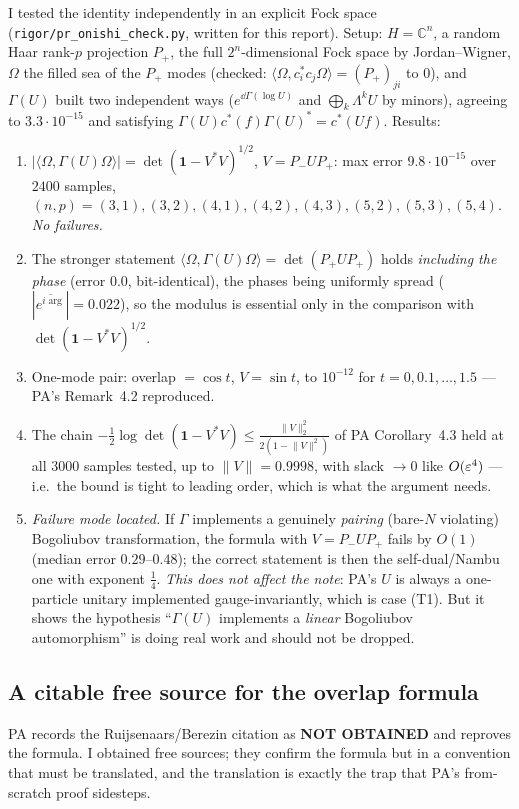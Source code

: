 \documentclass[11pt]{article}
\newcommand{\Pp}{P_+}\newcommand{\Pm}{P_-}
\providecommand{\Om}{\Omega}\providecommand{\Gm}{\Gamma}\providecommand{\Qt}{\widetilde Q}
\providecommand{\norm}[1]{\lVert #1\rVert}\providecommand{\abs}[1]{\lvert #1\rvert}
\providecommand{\ip}[2]{\langle #1,#2\rangle}\providecommand{\one}{\mathbf 1}
\begin{document}
I tested the identity independently in an explicit Fock space
(\texttt{rigor/pr\_onishi\_check.py}, written for this report).  Setup: $H=\mathbb C^n$, a random
Haar rank-$p$ projection $\Pp$, the full $2^n$-dimensional Fock space by Jordan--Wigner, $\Om$ the
filled sea of the $\Pp$ modes (checked: $\ip\Om{c_i^*c_j\Om}=(\Pp)_{ji}$ to $0$), and $\Gm(U)$ built
two independent ways ($e^{\dd\Gm(\log U)}$ and $\bigoplus_k\Lambda^kU$ by minors), agreeing to
$3.3\cdot10^{-15}$ and satisfying $\Gm(U)c^*(f)\Gm(U)^*=c^*(Uf)$.  Results:
\begin{enumerate}[label=(T\arabic*),leftmargin=3em]
\item $|\ip\Om{\Gm(U)\Om}|=\det(\one-V^*V)^{1/2}$, $V=\Pm U\Pp$: max error $9.8\cdot10^{-15}$ over
 $2400$ samples, $(n,p)=(3,1),(3,2),(4,1),(4,2),(4,3),(5,2),(5,3),(5,4)$.  \emph{No failures.}
\item The stronger statement $\ip\Om{\Gm(U)\Om}=\det(\Pp U\Pp)$ holds \emph{including the phase}
 (error $0.0$, bit-identical), the phases being uniformly spread ($|\overline{e^{i\arg}}|=0.022$),
 so the modulus is essential only in the comparison with $\det(\one-V^*V)^{1/2}$.
\item One-mode pair: overlap $=\cos t$, $V=\sin t$, to $10^{-12}$ for $t=0,0.1,\dots,1.5$
 --- PA's Remark~4.2 reproduced.
\item The chain $-\tfrac12\log\det(\one-V^*V)\le\frac{\norm V_2^2}{2(1-\norm V^2)}$ of PA
 Corollary~4.3 held at all $3000$ samples tested, up to $\norm V=0.9998$, with slack $\to0$ like
 $O(\varepsilon^4)$ --- i.e.\ the bound is tight to leading order, which is what the argument needs.
\item \emph{Failure mode located.}  If $\Gm$ implements a genuinely \emph{pairing} (bare-$N$
 violating) Bogoliubov transformation, the formula with $V=\Pm U\Pp$ fails by $O(1)$ (median error
 $0.29$--$0.48$); the correct statement is then the self-dual/Nambu one with exponent $\frac14$.
 \emph{This does not affect the note}: PA's $U$ is always a one-particle unitary implemented
 gauge-invariantly, which is case (T1).  But it shows the hypothesis ``$\Gm(U)$ implements a
 \emph{linear} Bogoliubov automorphism'' is doing real work and should not be dropped.
\end{enumerate}

\subsection{A citable free source for the overlap formula}
PA records the Ruijsenaars/Berezin citation as \textbf{NOT OBTAINED} and reproves the formula.  I
obtained free sources; they confirm the formula but in a convention that must be translated, and the
translation is exactly the trap that PA's from-scratch proof sidesteps.
\end{document}
